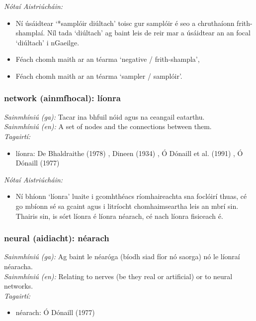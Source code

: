  \noindent \textit{Nótaí Aistriúcháin:}
\begin{itemize}
	\item Ní úsáidtear `*samplóir diúltach' toisc gur samplóir é seo a chruthaíonn frith-shamplaí. Níl tada `diúltach' ag baint leis de reir mar a úsáidtear an an focal `diúltach' i nGaeilge.
	\item Féach chomh maith ar an téarma `negative / frith-shampla',
	\item Féach chomh maith ar an téarma `sampler / samplóir'.
\end{itemize}


\subsubsection*{network (ainmfhocal): líonra}
 \noindent \textit{Sainmhíniú (ga):} Tacar ina bhfuil nóid agus na ceangail eatarthu.
\\
 \noindent \textit{Sainmhíniú (en):} A set of nodes and the connections between them.
\\
 \noindent \textit{Tagairtí:}
\begin{itemize}
	\item líonra: De Bhaldraithe (1978) \cite{de-bhaldraithe}, Dineen (1934) \cite{dineen}, Ó Dónaill et al. (1991) \cite{focloir-beag}, Ó Dónaill (1977) \cite{odonaill}
\end{itemize}

 \noindent \textit{Nótaí Aistriúcháin:}
\begin{itemize}
	\item Ní bhíonn `líonra' luaite i gcomhthéacs ríomhaireachta sna foclóirí thuas, cé go mbíonn sé sa gcaint agus i litríocht chomhaimseartha leis an mbrí sin. Thairis sin, is sórt líonra é líonra néarach, cé nach líonra fisiceach é.
\end{itemize}


\subsubsection*{neural (aidiacht): néarach}
 \noindent \textit{Sainmhíniú (ga):} Ag baint le néaróga (bíodh siad fíor nó saorga) nó le líonraí néaracha.
\\
 \noindent \textit{Sainmhíniú (en):} Relating to nerves (be they real or artificial) or to neural networks.
\\
 \noindent \textit{Tagairtí:}
\begin{itemize}
	\item néarach: Ó Dónaill (1977) \cite{odonaill}
\end{itemize}

